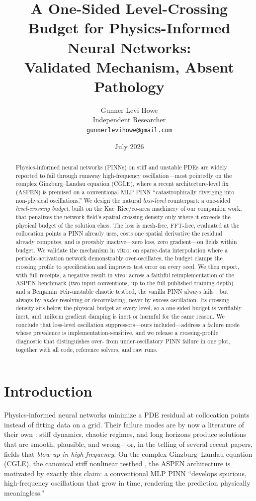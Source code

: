 \documentclass[10pt]{article}
\title{A One-Sided Level-Crossing Budget for Physics-Informed Neural
Networks:\\ Validated Mechanism, Absent Pathology}
\author{%
Gunner Levi Howe\\
Independent Researcher\\
\texttt{gunnerlevihowe@gmail.com}%
}
\date{July 2026}
\begin{document}
\maketitle

\begin{abstract}
Physics-informed neural networks (PINNs) on stiff and unstable PDEs are widely
reported to fail through runaway high-frequency oscillation---most pointedly on the
complex Ginzburg--Landau equation (CGLE), where a recent architecture-level fix
(ASPEN) is premised on a conventional MLP PINN ``catastrophically diverging into
non-physical oscillations.'' We design the natural \emph{loss-level} counterpart: a
one-sided \emph{level-crossing budget}, built on the Kac--Rice/co-area machinery of
our companion work, that penalizes the network field's spatial crossing density only
where it exceeds the physical budget of the solution class. The loss is mesh-free,
FFT-free, evaluated at the collocation points a PINN already uses, costs one spatial
derivative the residual already computes, and is provably inactive---zero loss,
zero gradient---on fields within budget. We validate the mechanism in vitro: on
sparse-data interpolation where a periodic-activation network demonstrably
over-oscillates, the budget clamps the crossing profile to specification and improves
test error on every seed. We then report, with full receipts, a negative result in
vivo: across a faithful reimplementation of the ASPEN benchmark (two input
conventions, up to the full published training depth) and a Benjamin--Feir-unstable
chaotic testbed, the vanilla PINN always fails---but always by \emph{under}-resolving
or decorrelating, never by excess oscillation. Its crossing density sits below the
physical budget at every level, so a one-sided budget is verifiably inert, and
uniform gradient damping is inert or harmful for the same reason. We conclude that
loss-level oscillation suppressors---ours included---address a failure mode whose
prevalence is implementation-sensitive, and we release a crossing-profile diagnostic
that distinguishes over- from under-oscillatory PINN failure in one plot, together
with all code, reference solvers, and raw runs.
\end{abstract}

\section{Introduction}
\label{sec:intro}

Physics-informed neural networks \citep{raissi2019pinn} minimize a PDE residual at
collocation points instead of fitting data on a grid. Their failure modes are by now
a literature of their own \citep{krishnapriyan2021failure,wang2024causal}: stiff
dynamics, chaotic regimes, and long horizons produce solutions that are smooth,
plausible, and wrong---or, in the telling of several recent papers, fields that
\emph{blow up in high frequency}. On the complex Ginzburg--Landau equation (CGLE),
the canonical stiff nonlinear testbed \citep{aranson2002cgle}, the ASPEN
architecture \citep{aspen2025} is motivated by exactly this claim: a conventional
MLP PINN ``develops spurious, high-frequency oscillations that grow in time,
rendering the prediction physically meaningless.''
\end{document}
